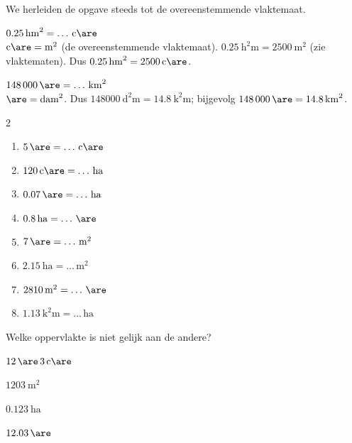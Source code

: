 \documentclass{bis}
\begin{document}
We herleiden de opgave steeds tot de overeenstemmende vlaktemaat.

\begin{voorbeeld}
\(\SI{0.25}{\square\hecto\metre}=\ldots\,\si{\centi\are}\)\\
\(\si{\centi\are} = \si{\square\metre}\) (de overeenstemmende vlaktemaat). \(\SI{0.25}{\square\hecto\metre}=\SI{2500}{\square\metre}\) (zie vlaktematen). Dus \(\SI{0.25}{\square\hecto\metre}=\SI{2500}{\centi\are}\).
\end{voorbeeld}

\begin{voorbeeld}
\(\SI{148000}{\are}=\ldots\,\si{\square\kilo\metre}\)\\
\(\si{\are}=\si{\square\deca\metre}\). Dus \(\SI{148000}{\square\deca\metre}=\SI{14.8}{\square\kilo\metre}\); bijgevolg \(\SI{148000}{\are}=\SI{14.8}{\square\kilo\metre}\).
\end{voorbeeld}

\begin{exercise}
\begin{multicols}{2}
\begin{enumerate}
  \item \(\SI{5}{\are}=\ldots\,\si{\centi\are}\)
  \item \(\SI{120}{\centi\are}=\ldots\,\si{\hectare}\)
  \item \(\SI{0.07}{\are}=\ldots\,\si{\hectare}\)
  \item \(\SI{0.8}{\hectare}=\ldots\,\si{\are}\)
  \item \(\SI{7}{\are}=\ldots\,\si{\square\metre}\)
  \item \(\SI{2.15}{\hectare}=\ldots\,\si{\square\metre}\)
  \item \(\SI{2810}{\square\metre}=\ldots\,\si{\are}\)
  \item \(\SI{1.13}{\square\kilo\metre}=\ldots\,\si{\hectare}\)
\end{enumerate}
\end{multicols}

Welke oppervlakte is niet gelijk aan de andere?
\begin{meerkeuze}
  \item \(\SI{12}{\are}\,\SI{3}{\centi\are}\)
  \item \(\SI{1203}{\square\metre}\)
  \item \(\SI{0.123}{\hectare}\)
  \item \(\SI{12.03}{\are}\)
\end{meerkeuze}
\end{exercise}
\end{document}
